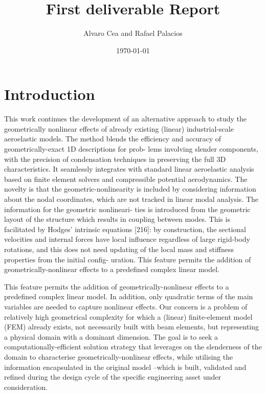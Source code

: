 \documentclass[11pt]{article}
\author{Alvaro Cea and Rafael Palacios}
\date{\today}
\title{First deliverable Report}
\begin{document}
\newcommand{\bs}[1]{\boldsymbol{#1}}
\newcommand{\rhoinf}{\rho}	
\newcommand{\Vinf}{U}
\newcommand{\Cl}[1]{c_{l_{#1}}}
\newcommand{\barCl}[1]{\bar{c}_{l_{#1}}}
\newcommand{\Cm}[1]{c_{m_{#1}}}
\newcommand{\barCm}[1]{\bar{c}_{m_{#1}}}
\newcommand{\AIC}{\bs{\mathcal{A}}}


\maketitle
\tableofcontents


\section{Introduction}
\label{sec:orgad08129}
This work continues the development of an alternative approach \cite{CEA2021,CEA2023} to study the
geometrically nonlinear effects of already existing (linear) industrial-scale aeroelastic models.
The method blends the efficiency and accuracy of geometrically-exact 1D descriptions for prob-
lems involving slender components, with the precision of condensation techniques in preserving
the full 3D characteristics. It seamlessly integrates with standard linear aeroelastic analysis
based on finite element solvers and compressible potential aerodynamics. The novelty is that
the geometric-nonlinearity is included by considering information about the nodal coordinates,
which are not tracked in linear modal analysis. The information for the geometric nonlineari-
ties is introduced from the geometric layout of the structure which results in coupling between
modes. This is facilitated by Hodges’ intrinsic equations [216]: by construction, the sectional
velocities and internal forces have local influence regardless of large rigid-body rotations, and
this does not need updating of the local mass and stiffness properties from the initial config-
uration. This feature permits the addition of geometrically-nonlinear effects to a predefined
complex linear model.

This feature permits the addition of geometrically-nonlinear effects to a predefined
complex linear model. In addition, only quadratic terms of the main variables are needed to capture nonlinear effects. Our concern is a problem of relatively high geometrical complexity
for which a (linear) finite-element model (FEM) already exists, not necessarily built with beam
elements, but representing a physical domain with a dominant dimension. The goal is to seek
a computationally-efficient solution strategy that leverages on the slenderness of the domain
to characterise geometrically-nonlinear effects, while utilising the information encapsulated in
the original model –which is built, validated and refined during the design cycle of the specific
engineering asset under consideration.
\end{document}
